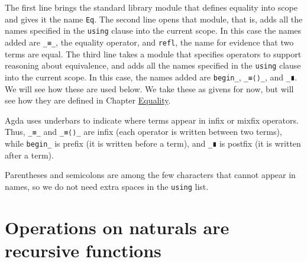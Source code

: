 \begin{fence}
\begin{code}%
\>[0]\AgdaSpace{}%
\AgdaSpace{}%
\AgdaSpace{}%
\<%
\\
\>[0]\AgdaSpace{}%
\AgdaSpace{}%
\AgdaSpace{}%
\AgdaSymbol{(}\AgdaSymbol{;}\AgdaSpace{}%
\AgdaSymbol{)}\<%
\\
\>[0]\AgdaSpace{}%
\AgdaSpace{}%
\AgdaSpace{}%
\AgdaSymbol{(}\AgdaSymbol{;}\AgdaSpace{}%
\AgdaSymbol{;}\AgdaSpace{}%
\AgdaSymbol{)}\<%
\end{code}
\end{fence}

The first line brings the standard library module that defines equality
into scope and gives it the name \texttt{Eq}. The second line opens that
module, that is, adds all the names specified in the \texttt{using}
clause into the current scope. In this case the names added are
\texttt{\_≡\_}, the equality operator, and \texttt{refl}, the name for
evidence that two terms are equal. The third line takes a module that
specifies operators to support reasoning about equivalence, and adds all
the names specified in the \texttt{using} clause into the current scope.
In this case, the names added are \texttt{begin\_}, \texttt{\_≡⟨⟩\_},
and \texttt{\_∎}. We will see how these are used below. We take these as
givens for now, but will see how they are defined in Chapter
\protect\hyperlink{Equality}{Equality}.

Agda uses underbars to indicate where terms appear in infix or mixfix
operators. Thus, \texttt{\_≡\_} and \texttt{\_≡⟨⟩\_} are infix (each
operator is written between two terms), while \texttt{begin\_} is prefix
(it is written before a term), and \texttt{\_∎} is postfix (it is
written after a term).

Parentheses and semicolons are among the few characters that cannot
appear in names, so we do not need extra spaces in the \texttt{using}
list.

\hypertarget{Naturals-plus}{%
\section{Operations on naturals are recursive
functions}\label{Naturals-plus}}

